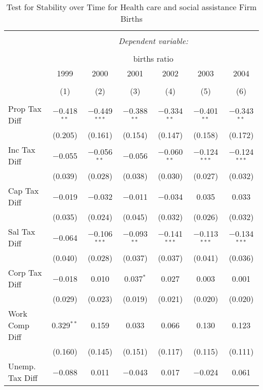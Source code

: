
\begin{table}[!htbp] \centering 
  \caption{Test for Stability over Time for  Health care and social assistance Firm Births} 
  \label{62year} 
\small 
\begin{tabular}{@{\extracolsep{5pt}}lcccccc} 
\\[-1.8ex]\hline 
\hline \\[-1.8ex] 
 & \multicolumn{6}{c}{\textit{Dependent variable:}} \\ 
\cline{2-7} 
\\[-1.8ex] & \multicolumn{6}{c}{births ratio} \\ 
 & 1999 & 2000 & 2001 & 2002 & 2003 & 2004 \\ 
\\[-1.8ex] & (1) & (2) & (3) & (4) & (5) & (6)\\ 
\hline \\[-1.8ex] 
 Prop Tax Diff & $-$0.418$^{**}$ & $-$0.449$^{***}$ & $-$0.388$^{**}$ & $-$0.334$^{**}$ & $-$0.401$^{**}$ & $-$0.343$^{**}$ \\ 
  & (0.205) & (0.161) & (0.154) & (0.147) & (0.158) & (0.172) \\ 
  Inc Tax Diff & $-$0.055 & $-$0.056$^{**}$ & $-$0.056 & $-$0.060$^{**}$ & $-$0.124$^{***}$ & $-$0.124$^{***}$ \\ 
  & (0.039) & (0.028) & (0.038) & (0.030) & (0.027) & (0.032) \\ 
  Cap Tax Diff & $-$0.019 & $-$0.032 & $-$0.011 & $-$0.034 & 0.035 & 0.033 \\ 
  & (0.035) & (0.024) & (0.045) & (0.032) & (0.026) & (0.032) \\ 
  Sal Tax Diff & $-$0.064 & $-$0.106$^{***}$ & $-$0.093$^{**}$ & $-$0.141$^{***}$ & $-$0.113$^{***}$ & $-$0.134$^{***}$ \\ 
  & (0.040) & (0.028) & (0.037) & (0.037) & (0.041) & (0.036) \\ 
  Corp Tax Diff & $-$0.018 & 0.010 & 0.037$^{*}$ & 0.027 & 0.003 & 0.001 \\ 
  & (0.029) & (0.023) & (0.019) & (0.021) & (0.020) & (0.020) \\ 
  Work Comp Diff & 0.329$^{**}$ & 0.159 & 0.033 & 0.066 & 0.130 & 0.123 \\ 
  & (0.160) & (0.145) & (0.151) & (0.117) & (0.115) & (0.111) \\ 
  Unemp. Tax Diff & $-$0.088 & 0.011 & $-$0.043 & 0.017 & $-$0.024 & 0.061 \\ 

\end{tabular}
\end{table}

